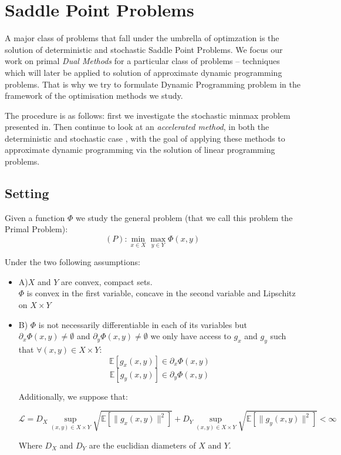 \documentclass[12pt,reqno]{amsart}
\numberwithin{equation}{section}
\begin{document}
\section{Saddle Point Problems}

A major class of problems that fall under the umbrella of optimzation is the solution of deterministic and stochastic Saddle Point Problems. We focus our work on primal \emph{Dual Methods} for a particular class of problems -- techniques which will later be applied to solution of approximate dynamic programming problems.
That is why we try to formulate Dynamic Programming problem in the framework of the optimisation methods we study.

The procedure is as follows: first we investigate the stochastic minmax problem presented in\cite{NemirovskiRubinstein}. Then continue to look at an \emph{accelerated method}, in both the deterministic \cite{ChambollePock} and stochastic case \cite{ChenLanOuyang}, with the goal of applying these methods to approximate dynamic programming via the solution of linear programming problems.

\subsection{Setting}

Given a function $\Phi$ we study the general problem (that we call this problem the Primal Problem):
$$
\boxed{ (P): \min_{x \in X}\max_{y \in Y} \Phi(x,y) }
$$

Under the two following assumptions:

\begin{itemize}
\item A)$X$ and $Y$ are convex, compact sets.\\ $\Phi$ is convex in the first variable, concave in the second variable and Lipschitz on $X \times Y$
\item B) $\Phi$ is not necessarily differentiable in each of its variables but $\partial_{x} \Phi(x,y) \neq  \emptyset $ and $\partial_{y} \Phi(x,y) \neq  \emptyset $
 we only have access to $g_{x}$ and $g_{y}$ such that $\forall (x,y) \in X \times Y$: \\
$$\mathbb{E}[g_{x}(x,y)] \in \partial_{x} \Phi(x,y) $$
$$\mathbb{E}[g_{y}(x,y)] \in \partial_{y} \Phi(x,y) $$

Additionally, we suppose that:

$$
\mathcal{L} = D_{X} \sup_{(x,y) \in X \times Y} \sqrt{\mathbb{E}[\lVert g_{x}(x,y) \rVert^{2}]}+ D_{Y} \sup_{(x,y) \in X \times Y}\sqrt{\mathbb{E}[\lVert g_{y}(x,y) \rVert^{2}]} < \infty
$$

Where $D_{X}$ and $D_{Y}$ are the euclidian diameters of $X$ and $Y$.

\end{itemize}
\end{document}

